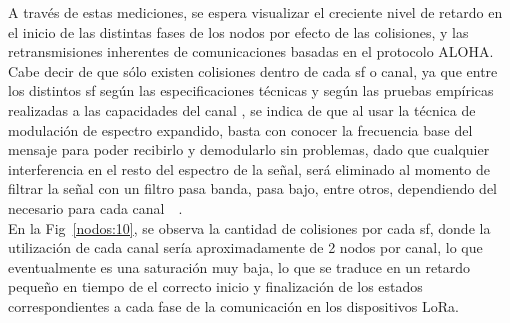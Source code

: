 \begin{justify}
A través de estas mediciones, se espera visualizar el creciente nivel de retardo en el inicio de las distintas fases de los nodos por efecto de las colisiones, y las retransmisiones inherentes de comunicaciones basadas en el protocolo ALOHA. Cabe decir de que sólo existen colisiones dentro de cada \gls{sf} o canal, ya que entre los distintos \gls{sf} según las especificaciones técnicas  y según las pruebas empíricas realizadas a las capacidades del canal , se indica de que al usar la técnica de modulación de espectro expandido, basta con conocer la frecuencia base del mensaje para poder recibirlo y demodularlo sin problemas, dado que cualquier interferencia en el resto del espectro de la señal, será eliminado al momento de filtrar la señal con un filtro pasa banda, pasa bajo, entre otros, dependiendo del necesario para cada canal~\cite{Sornin}~\cite{Xavier}.\\
En la Fig~\ref{nodos:10}, se observa la cantidad de colisiones por cada \gls{sf}, donde la utilización de cada canal sería aproximadamente de 2 nodos por canal, lo que eventualmente es una saturación muy baja, lo que se traduce en un retardo pequeño en tiempo de el correcto inicio y finalización de los estados correspondientes a cada fase de la comunicación en los dispositivos LoRa.


\end{justify}
